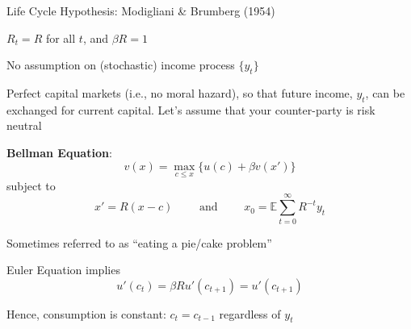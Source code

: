 \documentclass[11pt, aspectratio=169]{beamer}
\newenvironment{witemize}{\itemize\addtolength{\itemsep}{10pt}}{\enditemize}
\begin{document}
\begin{frame}{}
Life Cycle Hypothesis: Modigliani \& Brumberg (1954)
\vspace{3mm}
\begin{witemize}
\item $R_t = R$ for all $t$, and $\beta R = 1$

\item No assumption on (stochastic) income process $\{y_t\}$

\item Perfect capital markets (i.e., no moral hazard), so that future income, $y_t$, can be exchanged for current capital. Let's assume that your counter-party is risk neutral
\end{witemize}
\end{frame}


\begin{frame}{}

\textbf{Bellman Equation}:
\begin{equation*}
	v(x) = \max_{c \leq x} \Big\{u(c) + \beta v(x') \Big\} 
\end{equation*}
subject to
\begin{equation*}
	x' = R(x - c) 
	\quad\quad \text{ and } \quad\quad
	x_0 = \mathbb E \sum_{t=0}^\infty R^{-t} y_t
\end{equation*}

\vspace{3mm}
\begin{witemize}
\item Sometimes referred to as ``eating a pie/cake problem''

\item Euler Equation implies
\begin{equation*}
	u'(c_t) = \beta R u'(c_{t+1}) = u'(c_{t+1}) 
\end{equation*}

\item Hence, consumption is constant: $c_t = c_{t-1}$ regardless of $y_t$
\end{witemize}
\end{frame}
\end{document}
